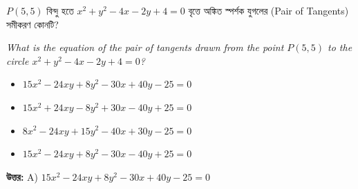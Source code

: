 \documentclass[12pt, a4paper]{article}
\begin{document}
\vspace{2em}

\begin{tcolorbox}[questionbox={প্রশ্ন (Question) 26}]
    \noindent
    $P(5, 5)$ বিন্দু হতে $x^2 + y^2 - 4x - 2y + 4 = 0$ বৃত্তে অঙ্কিত স্পর্শক যুগলের (Pair of Tangents) সমীকরণ কোনটি?
    
    \vspace{0.8em}
    \begin{english}
    \noindent\textit{\color{darkgray}
    What is the equation of the pair of tangents drawn from the point $P(5, 5)$ to the circle $x^2 + y^2 - 4x - 2y + 4 = 0$?
    }
    \end{english}
\end{tcolorbox}

\vspace{1em}
\begin{itemize}[label={}, leftmargin=1cm, itemsep=0.5em]
    \item[\textbf{A)}] $15x^2 - 24xy + 8y^2 - 30x + 40y - 25 = 0$
    \item[\textbf{B)}] $15x^2 + 24xy - 8y^2 + 30x - 40y + 25 = 0$
    \item[\textbf{C)}] $8x^2 - 24xy + 15y^2 - 40x + 30y - 25 = 0$
    \item[\textbf{D)}] $15x^2 - 24xy + 8y^2 - 30x - 40y + 25 = 0$
\end{itemize}

\vspace{0.5em}
\begin{tcolorbox}[answerbox]
    \textbf{\color{success} উত্তর:} A) $15x^2 - 24xy + 8y^2 - 30x + 40y - 25 = 0$
\end{tcolorbox}
\vspace{1em}
\end{document}
